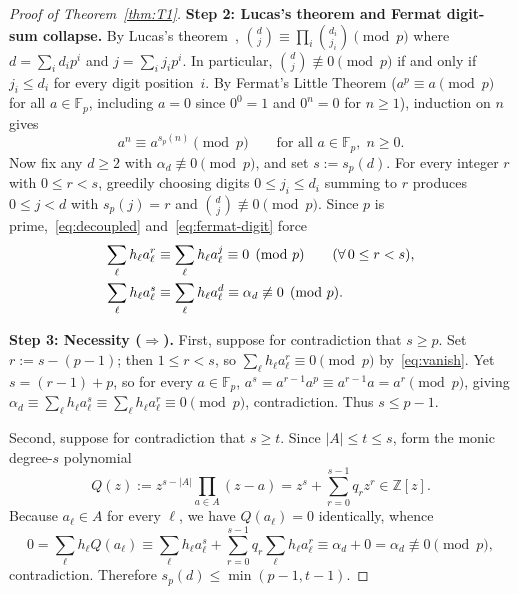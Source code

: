\documentclass[11pt,reqno]{amsart}
\theoremstyle{definition}
\newcommand{\F}{\mathbb{F}}
\newcommand{\Z}{\mathbb{Z}}
\begin{document}
\begin{proof}[Proof of Theorem~\ref{thm:T1}]
\smallskip
\noindent\textbf{Step 2: Lucas's theorem and Fermat digit-sum collapse.}
By Lucas's theorem~\cite{Lucas1878}, $\binom{d}{j} \equiv \prod_i \binom{d_i}{j_i} \pmod{p}$ where $d = \sum_i d_i p^i$ and $j = \sum_i j_i p^i$.
In particular, $\binom{d}{j} \not\equiv 0 \pmod{p}$ if and only if $j_i \le d_i$ for every digit position~$i$.
By Fermat's Little Theorem ($a^p \equiv a \pmod p$ for all $a \in \F_p$, including $a = 0$ since $0^0 = 1$ and $0^n = 0$ for $n \ge 1$), induction on $n$ gives
\begin{equation}
\label{eq:fermat-digit}
  a^n \equiv a^{s_p(n)} \pmod{p} \qquad \text{for all } a \in \F_p,\; n \ge 0.
\end{equation}
Now fix any $d \ge 2$ with $\alpha_d \not\equiv 0 \pmod{p}$, and set $s := s_p(d)$.
For every integer $r$ with $0 \le r < s$, greedily choosing digits $0 \le j_i \le d_i$ summing to $r$ produces $0 \le j < d$ with $s_p(j) = r$ and $\binom{d}{j} \not\equiv 0 \pmod{p}$.
Since $p$ is prime,~\eqref{eq:decoupled} and~\eqref{eq:fermat-digit} force
\begin{align}
\label{eq:vanish}
  \sum_\ell h_\ell a_\ell^r &\equiv \sum_\ell h_\ell a_\ell^j \equiv 0 \pmod{p} \qquad (\forall\, 0 \le r < s), \\
  \sum_\ell h_\ell a_\ell^s &\equiv \sum_\ell h_\ell a_\ell^d \equiv \alpha_d \not\equiv 0 \pmod{p}. \notag
\end{align}

\smallskip
\noindent\textbf{Step 3: Necessity ($\Rightarrow$).}
First, suppose for contradiction that $s \ge p$.
Set $r := s - (p - 1)$; then $1 \le r < s$, so $\sum_\ell h_\ell a_\ell^r \equiv 0 \pmod{p}$ by~\eqref{eq:vanish}.
Yet $s = (r - 1) + p$, so for every $a \in \F_p$, $a^s = a^{r-1} a^p \equiv a^{r-1} a = a^r \pmod{p}$, giving $\alpha_d \equiv \sum_\ell h_\ell a_\ell^s \equiv \sum_\ell h_\ell a_\ell^r \equiv 0 \pmod{p}$, contradiction.
Thus $s \le p - 1$.

Second, suppose for contradiction that $s \ge t$.
Since $|A| \le t \le s$, form the monic degree-$s$ polynomial
\[
  Q(z) := z^{s - |A|} \prod_{a \in A} (z - a) = z^s + \sum_{r=0}^{s-1} q_r z^r \in \Z[z].
\]
Because $a_\ell \in A$ for every $\ell$, we have $Q(a_\ell) = 0$ identically, whence
\[
  0 = \sum_\ell h_\ell Q(a_\ell) \equiv \sum_\ell h_\ell a_\ell^s + \sum_{r=0}^{s-1} q_r \sum_\ell h_\ell a_\ell^r \equiv \alpha_d + 0 = \alpha_d \not\equiv 0 \pmod{p},
\]
contradiction.
Therefore $s_p(d) \le \min(p - 1, t - 1)$.


\end{proof}
\end{document}

